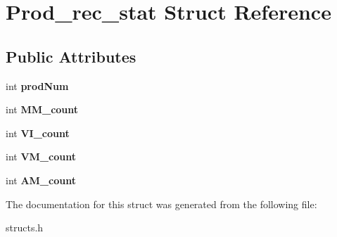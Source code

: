 \hypertarget{struct_prod__rec__stat}{}\section{Prod\+\_\+rec\+\_\+stat Struct Reference}
\label{struct_prod__rec__stat}
\subsection*{Public Attributes}
\begin{DoxyCompactItemize}
\item 
\mbox{\label{struct_prod__rec__stat_a49f3f07267635757d6b4c207b2b3d124}} 
int {\bfseries prod\+Num}
\item 
\mbox{\label{struct_prod__rec__stat_a5226aedc281e6f571ad570514e115dcd}} 
int {\bfseries M\+M\+\_\+count}
\item 
\mbox{\label{struct_prod__rec__stat_ab5c0403746852cc5a278afcca8b15442}} 
int {\bfseries V\+I\+\_\+count}
\item 
\mbox{\label{struct_prod__rec__stat_a4199632270916451302a82e7d2506a93}} 
int {\bfseries V\+M\+\_\+count}
\item 
\mbox{\label{struct_prod__rec__stat_a409ce8f8deca0f6abb30655663679e37}} 
int {\bfseries A\+M\+\_\+count}
\end{DoxyCompactItemize}


The documentation for this struct was generated from the following file\+:\begin{DoxyCompactItemize}
\item 
structs.\+h\end{DoxyCompactItemize}

